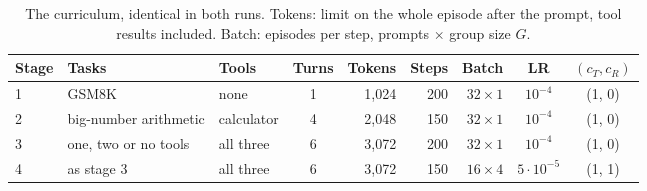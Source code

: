 \documentclass[11pt,a4paper]{article}
\begin{document}
\begin{table}[t]
\centering\small
\caption{The curriculum, identical in both runs. Tokens: limit on the whole
episode after the prompt, tool results included. Batch: episodes per step,
prompts $\times$ group size $G$.}
\label{tab:stages}
\begin{tabular}{@{}lllcrrrcc@{}}
\toprule
\headrow Stage & Tasks & Tools & Turns & Tokens & Steps & Batch & LR
  & $(c_T, c_R)$ \\
\midrule
1 & GSM8K & none & 1 & 1{,}024 & 200 & $32\times1$ & $10^{-4}$ & (1, 0) \\
2 & big-number arithmetic & calculator & 4 & 2{,}048 & 150 & $32\times1$
  & $10^{-4}$ & (1, 0) \\
3 & one, two or no tools & all three & 6 & 3{,}072 & 200 & $32\times1$
  & $10^{-4}$ & (1, 0) \\
4 & as stage 3 & all three & 6 & 3{,}072 & 150 & $16\times4$
  & $5\cdot10^{-5}$ & (1, 1) \\
\bottomrule
\end{tabular}
\end{table}
\end{document}
